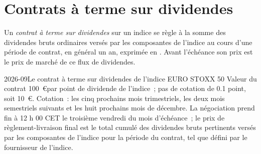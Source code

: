 \begin{omfigure}

\label{fig:m1:index-and-single-stock-futures-worldwide:relay}
\end{omfigure}

\section{Contrats à terme sur dividendes}

\begin{definition}\label{def:m1:index-and-single-stock-futures-worldwide:divfut}
Un \emph{contrat à terme sur dividendes} sur un indice se règle à la
somme des dividendes bruts ordinaires versés par les composantes de l'indice au cours
d'une période de contrat, en général un an, exprimée en . Avant l'échéance
son prix est le prix de marché de ce flux de dividendes.
\end{definition}

\begin{dated}{2026-09}{Le contrat à terme sur dividendes de l'indice EURO STOXX 50}\label{dat:m1:index-and-single-stock-futures-worldwide:fexd}
Valeur du contrat 100~\euro par point de dividende de l'indice~; pas de cotation de 0.1 point, soit 10~\euro.
Cotation~: les cinq prochains mois trimestriels, les deux mois semestriels suivants
et les huit prochains mois de décembre. La négociation prend fin à 12 h 00 CET le
troisième vendredi du mois d'échéance~; le prix de règlement-livraison final est le
total cumulé des dividendes bruts pertinents versés par les composantes de l'indice
pour la période du contrat, tel que défini par le fournisseur de l'indice.
\end{dated}

